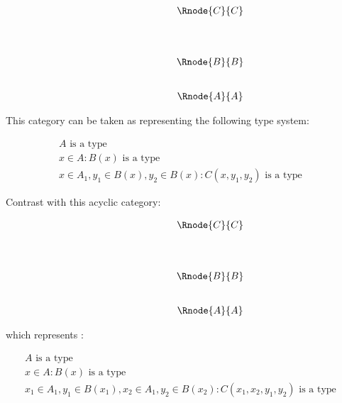 \documentclass[10pt,a4paper]{scrartcl}
\begin{document}
\begin{center}
\begin{equation}
\begin{array}{p{1.5cm}cccp{2cm}c}
&                & \Rnode{C}{C}&   \\ [1.4cm]
&                & \Rnode{B}{B} &  \\ [0.8cm]
&                & \Rnode{A}{A} &  
\end{array}
\end{equation}
\setlength {\saroffsetA}{-2pt}
\setlength {\saroffsetB}{-2pt}
\sarreset
\end{center}


\noindent This category can be taken as representing the following type system:
\addtocounter{equation}{-1}
\begin{align}
&A\mbox{ is a type} && \tag*{(\theequation a)}\\
&x\in A: B(x) \mbox{ is a type} && \tag*{(\theequation b)}\\
&x\in A_1, y_1 \in B(x), y_2 \in B(x) : C(x,y_1,y_2) \mbox{ is a type} && \tag*{(\theequation c)}
\end{align}

\noindent
Contrast with this acyclic category:
\begin{center}
\begin{equation}
\begin{array}{p{1.5cm}cccp{2cm}c}
&                & \Rnode{C}{C}&   \\ [1.4cm]
&                & \Rnode{B}{B} &  \\ [0.8cm]
&                & \Rnode{A}{A} &  
\end{array}
\end{equation}
\setlength {\saroffsetA}{-2pt}
\setlength {\saroffsetB}{-2pt}
\setlength {\saroffsetA}{2pt}
\setlength {\saroffsetB}{2pt}
\sarreset
\end{center}
\noindent
which represents :
\addtocounter{equation}{-1}
\begin{align}
&A\mbox{ is a type} && \tag*{(\theequation a)}\\
&x\in A: B(x) \mbox{ is a type} && \tag*{(\theequation b)}\\
&x_1\in A_1, y_1 \in B(x_1), x_2\in A_1, y_2 \in B(x_2) : C(x_1,x_2,y_1,y_2) \mbox{ is a type} && \tag*{(\theequation c)}
\end{align}
\end{document}
